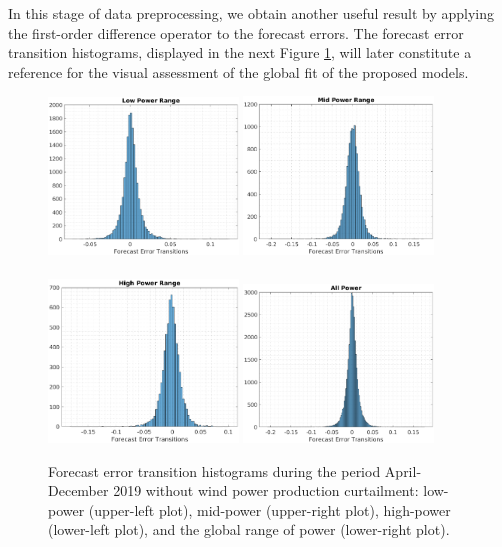 \documentclass[11pt]{article}
\theoremstyle{definition}
\begin{document}
In this stage of data preprocessing, we obtain another useful result by applying the first-order difference operator to the forecast errors. 
The forecast error transition histograms, displayed in the next Figure \ref{fig:error_transitions}, will later constitute a reference for the visual assessment of the global fit of the proposed models.

\begin{figure}[H]
\centering
\includegraphics[width=0.45\textwidth]{plots/LP_t.eps}
\includegraphics[width=0.45\textwidth]{plots/MP_t.eps}\\
\quad\\
\includegraphics[width=0.45\textwidth]{plots/HP_t.eps}
\includegraphics[width=0.45\textwidth]{plots/AP_t.eps}
\caption{Forecast error transition histograms during the period April-December 2019 without wind power production curtailment: low-power (upper-left plot), mid-power (upper-right plot), high-power (lower-left plot), and the global range of power (lower-right plot).}
\label{fig:error_transitions}
\end{figure}
\end{document}
